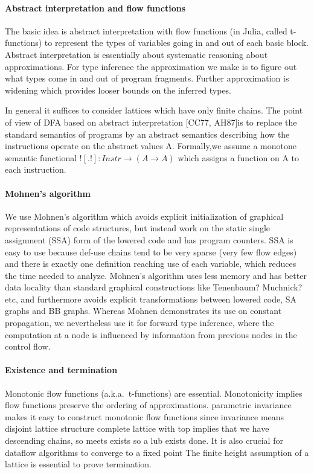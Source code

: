 \documentclass[pldi]{sigplanconf-pldi15}
\begin{document}




\paragraph{Abstract interpretation and flow functions}
The basic idea is abstract interpretation with flow functions (in Julia, called
t-functions) to represent the types of variables going in and out of each basic
block.  Abstract interpretation is essentially about systematic reasoning about
approximations. For type inference the approximation we make is to figure out
what types come in and out of program fragments. Further approximation is
widening which provides looser bounds on the inferred types. 

In general it suffices to consider lattices which have only finite chains. The
point of view of DFA based on abstract interpretation [CC77, AH87]is to replace
the standard semantics of programs by an abstract semantics describing how the
instructions operate on the abstract values A. Formally,we assume a
monotone semantic functional $![.!] : Instr \rightarrow (A \rightarrow A)$
which assigns a function on A to each instruction.

\paragraph{Mohnen's algorithm}
We use Mohnen's algorithm which avoids explicit initialization of graphical
representations of code structures, but instead work on the static single
assignment (SSA) form of the lowered code and has program counters. SSA is easy
to use because def-use chains tend to be very sparse (very few flow edges) and
there is exactly one definition reaching use of each variable, which reduces
the time needed to analyze. Mohnen's algorithm uses less memory and has better
data locality than standard graphical constructions like Tenenbaum? Muchnick?
etc, and furthermore avoids explicit transformations between lowered code, SA
graphs and BB graphs. Whereas Mohnen demonstrates its use on constant
propagation, we nevertheless use it for forward type inference, where the
computation at a node is influenced by information from previous nodes in the
control flow.

\paragraph{Existence and termination}
Monotonic flow functions (a.k.a.\ t-functions) are essential.
Monotonicity implies flow functions preserve the ordering of approximations.
parametric invariance makes it easy to construct monotonic flow functions since invariance means disjoint lattice structure
complete lattice with top implies that we have descending chains, so meets exists so a lub exists done.
It is also crucial for dataflow algorithms to converge to a fixed point
The finite height assumption of a lattice is essential to prove termination.
\end{document}
